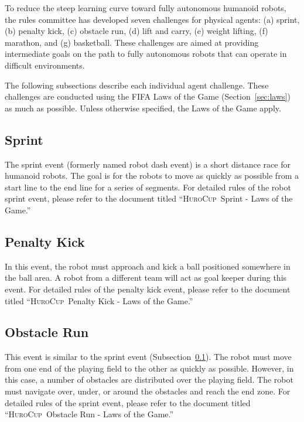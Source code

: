 \documentclass[12pt]{article}
\newcommand{\HuroCup}{\textsc{HuroCup}}
\newcounter{law}[section]
\begin{document}
To reduce the steep learning curve toward fully autonomous humanoid
robots, the rules committee has developed seven challenges for
physical agents: (a) sprint, (b) penalty kick, (c) obstacle run, (d)
lift and carry, (e) weight lifting, (f) marathon, and (g)
basketball. These challenges are aimed at providing intermediate goals
on the path to fully autonomous robots that can operate in difficult
environments.

The following subsections describe each individual agent
challenge. These challenges are conducted using the FIFA Laws of the
Game (Section~\ref{sec:laws}) as much as possible. Unless otherwise
specified, the Laws of the Game apply.

\subsection{Sprint}
\label{subsec:sprint}

The sprint event (formerly named robot dash event) is a short distance
race for humanoid robots. The goal is for the robots to move as
quickly as possible from a start line to the end line for a series of
segments. For detailed rules of the robot sprint event, please refer to
the document titled ``\HuroCup\ Sprint - Laws of the Game.''

\subsection{Penalty Kick}
\label{subsec:penalty-kick}

In this event, the robot must approach and kick a ball positioned
somewhere in the ball area. A robot from a different team will act as
goal keeper during this event. For detailed rules of the penalty kick
event, please refer to the document titled ``\HuroCup\ Penalty
Kick - Laws of the Game.''

\subsection{Obstacle Run}
\label{subsec:obstacle-run} 

This event is similar to the sprint event
(Subsection~\ref{subsec:sprint}). The robot must move from one end of
the playing field to the other as quickly as possible. However, in
this case, a number of obstacles are distributed over the playing
field. The robot must navigate over, under, or around the obstacles
and reach the end zone. For detailed rules of the sprint event, please
refer to the document titled ``\HuroCup\ Obstacle Run - Laws of the
Game.''
\end{document}
